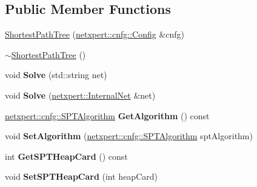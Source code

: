 \subsection*{Public Member Functions}
\begin{DoxyCompactItemize}
\item 
\hyperlink{classnetxpert_1_1ShortestPathTree_a98b5de4fe83005fdba7216253d81b4f8}{Shortest\+Path\+Tree} (\hyperlink{structnetxpert_1_1cnfg_1_1Config}{netxpert\+::cnfg\+::\+Config} \&cnfg)
\item 
\hyperlink{classnetxpert_1_1ShortestPathTree_a6f1ad2e2a4f8f99927eb960a4c706d34}{$\sim$\+Shortest\+Path\+Tree} ()
\item 
void {\bfseries Solve} (std\+::string net)\hypertarget{classnetxpert_1_1ShortestPathTree_a9d051b476c6e16c8382f00c6fd41443c}{}\label{classnetxpert_1_1ShortestPathTree_a9d051b476c6e16c8382f00c6fd41443c}

\item 
void {\bfseries Solve} (\hyperlink{classnetxpert_1_1InternalNet}{netxpert\+::\+Internal\+Net} \&net)\hypertarget{classnetxpert_1_1ShortestPathTree_afaab6c93fa959a87162b23d65a7e77c6}{}\label{classnetxpert_1_1ShortestPathTree_afaab6c93fa959a87162b23d65a7e77c6}

\item 
\hyperlink{namespacenetxpert_1_1cnfg_a6ff755ed7f76e0049e3eeeed86c9b55d}{netxpert\+::cnfg\+::\+S\+P\+T\+Algorithm} {\bfseries Get\+Algorithm} () const \hypertarget{classnetxpert_1_1ShortestPathTree_a3991a05aedb7e38953aa1031db9566bd}{}\label{classnetxpert_1_1ShortestPathTree_a3991a05aedb7e38953aa1031db9566bd}

\item 
void {\bfseries Set\+Algorithm} (\hyperlink{namespacenetxpert_1_1cnfg_a6ff755ed7f76e0049e3eeeed86c9b55d}{netxpert\+::cnfg\+::\+S\+P\+T\+Algorithm} spt\+Algorithm)\hypertarget{classnetxpert_1_1ShortestPathTree_a25a50385e71110a61f13f7627123f38d}{}\label{classnetxpert_1_1ShortestPathTree_a25a50385e71110a61f13f7627123f38d}

\item 
int {\bfseries Get\+S\+P\+T\+Heap\+Card} () const \hypertarget{classnetxpert_1_1ShortestPathTree_a27ba660aebb8e7542a640ed89af60b63}{}\label{classnetxpert_1_1ShortestPathTree_a27ba660aebb8e7542a640ed89af60b63}

\item 
void {\bfseries Set\+S\+P\+T\+Heap\+Card} (int heap\+Card)\hypertarget{classnetxpert_1_1ShortestPathTree_a7d0f7d46f546d67c4d14f561935f4d45}{}\label{classnetxpert_1_1ShortestPathTree_a7d0f7d46f546d67c4d14f561935f4d45}


\end{DoxyCompactItemize}
